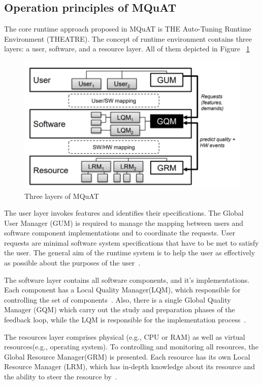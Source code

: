 \subsection{Operation principles of MQuAT}

The core runtime approach proposed in MQuAT is THE Auto-Tuning Runtime Environment (THEATRE)\cite{gotz10, gotz12}.
The concept of runtime environment contains three layers: a user, software, and a resource layer. All of them depicted in Figure ~\ref{fig:threelayersmquat}

\begin{figure}
	\centering
	\includegraphics[width=\textwidth]{images/ThreeLayersMQuAT}
	\caption[Three layers of MQuAT]{Three layers of MQuAT}
	\label{fig:threelayersmquat}
\end{figure}

The user layer invokes features and identifies their specifications. The  Global  User  Manager  (GUM)  is required to manage the mapping between users and software component implementations and to coordinate the requests. User requests are minimal software system specifications that have to be met to satisfy the user. The general aim of the runtime system is to help the user as effectively as possible about the purposes of the user~\cite{gotz13}.

The software layer contains all software components, and it's implementations. Each component has a Local Quality Manager(LQM), which responsible for controlling the set of components~\cite{gotz13, ahmad18}. Also, there is a single Global Quality Manager (GQM) which carry out the study and preparation phases of the feedback loop, while the LQM is responsible for the implementation process~\cite{gotz13}.

The resources layer comprises physical (e.g., CPU or RAM) as well as virtual resources(e.g., operating system).
To controlling and monitoring all resources, the Global Resource Manager(GRM) is presented. Each resource has its own Local Resource Manager (LRM), which has in-depth knowledge about its resource and the ability to steer the resource by~\cite{gotz13, ahmad18}.

